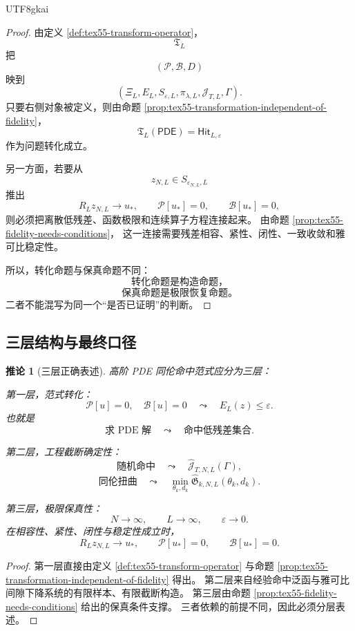 \documentclass[12pt]{article}
\newtheorem{corollary}{推论}[section]
\begin{document}
\begin{CJK*}{UTF8}{gkai}
\begin{proof}
由定义 \ref{def:tex55-transform-operator}，
\[
  \mathfrak T_L
\]
把
\[
  (\mathcal P,\mathcal B,D)
\]
映到
\[
  (\Xi_L,E_L,S_{\varepsilon,L},\pi_{\lambda,L},\mathcal J_{T,L},\Gamma).
\]
只要右侧对象被定义，则由命题
\ref{prop:tex55-transformation-independent-of-fidelity}，
\[
  \mathfrak T_L(\mathsf{PDE})
  =
  \mathsf{Hit}_{L,\varepsilon}
\]
作为问题转化成立。

另一方面，若要从
\[
  z_{N,L}\in S_{\varepsilon_{N,L},L}
\]
推出
\[
  R_Lz_{N,L}\to u_*,
  \qquad
  \mathcal P[u_*]=0,
  \qquad
  \mathcal B[u_*]=0,
\]
则必须把离散低残差、函数极限和连续算子方程连接起来。
由命题 \ref{prop:tex55-fidelity-needs-conditions}，
这一连接需要残差相容、紧性、闭性、一致收敛和雅可比稳定性。

所以，转化命题与保真命题不同：
\[
  \text{转化命题是构造命题，}
\]
\[
  \text{保真命题是极限恢复命题。}
\]
二者不能混写为同一个“是否已证明”的判断。
\end{proof}

\subsection{三层结构与最终口径}
\label{subsec:tex55-three-level-correction}

\begin{corollary}[三层正确表述]
\label{cor:tex55-three-level-correction}
高阶 PDE 同伦命中范式应分为三层：

第一层，范式转化：
\[
  \mathcal P[u]=0,\quad \mathcal B[u]=0
  \quad
  \leadsto
  \quad
  E_L(z)\le\varepsilon.
\]
也就是
\[
  \text{求 PDE 解}
  \quad
  \leadsto
  \quad
  \text{命中低残差集合}.
\]

第二层，工程截断确定性：
\[
  \text{随机命中}
  \quad
  \leadsto
  \quad
  \widehat{\mathcal J}_{T,N,L}(\Gamma),
\]
\[
  \text{同伦扭曲}
  \quad
  \leadsto
  \quad
  \min_{\theta_k,d_k}
  \widehat{\mathfrak G}_{k,N,L}(\theta_k,d_k).
\]

第三层，极限保真性：
\[
  N\to\infty,\qquad
  L\to\infty,\qquad
  \varepsilon\to0.
\]
在相容性、紧性、闭性与稳定性成立时，
\[
  R_Lz_{N,L}\to u_*,
  \qquad
  \mathcal P[u_*]=0,
  \qquad
  \mathcal B[u_*]=0.
\]
\end{corollary}

\begin{proof}
第一层直接由定义 \ref{def:tex55-transform-operator} 与命题
\ref{prop:tex55-transformation-independent-of-fidelity} 得出。
第二层来自经验命中泛函与雅可比间隙下降系统的有限样本、有限截断构造。
第三层由命题 \ref{prop:tex55-fidelity-needs-conditions} 给出的保真条件支撑。
三者依赖的前提不同，因此必须分层表述。
\end{proof}


\end{CJK*}
\end{document}
